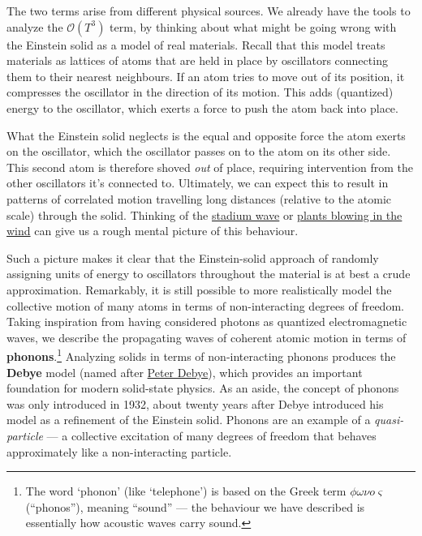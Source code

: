 \documentclass[12 pt]{article} %
\newcommand{\cO}{\ensuremath{\mathcal O} }
\newcommand{\om}{\ensuremath{\omega} }
\begin{document}
The two terms arise from different physical sources.
We already have the tools to analyze the $\cO(T^3)$ term, by thinking about what might be going wrong with the Einstein solid as a model of real materials.
Recall that this model treats materials as lattices of atoms that are held in place by oscillators connecting them to their nearest neighbours.
If an atom tries to move out of its position, it compresses the oscillator in the direction of its motion.
This adds (quantized) energy to the oscillator, which exerts a force to push the atom back into place.

What the Einstein solid neglects is the equal and opposite force the atom exerts on the oscillator, which the oscillator passes on to the atom on its other side.
This second atom is therefore shoved \textit{out} of place, requiring intervention from the other oscillators it's connected to.
Ultimately, we can expect this to result in patterns of correlated motion travelling long distances (relative to the atomic scale) through the solid.
Thinking of the \href{https://en.wikipedia.org/wiki/Wave_(audience)}{stadium wave} or \href{https://www.youtube.com/watch?v=uTlwzsud-zg}{plants blowing in the wind} can give us a rough mental picture of this behaviour.

Such a picture makes it clear that the Einstein-solid approach of randomly assigning units of energy to oscillators throughout the material is at best a crude approximation.
Remarkably, it is still possible to more realistically model the collective motion of many atoms in terms of non-interacting degrees of freedom.
Taking inspiration from having considered photons as quantized electromagnetic waves, we describe the propagating waves of coherent atomic motion in terms of \textbf{phonons}.\footnote{The word `phonon' (like `telephone') is based on the Greek term $\phi \om \nu o \varsigma$ (``phonos''), meaning ``sound'' --- the behaviour we have described is essentially how acoustic waves carry sound.}
Analyzing solids in terms of non-interacting phonons produces the \textbf{Debye} model (named after \href{https://en.wikipedia.org/wiki/Peter_Debye}{Peter Debye}), which provides an important foundation for modern solid-state physics.
As an aside, the concept of phonons was only introduced in 1932, about twenty years after Debye introduced his model as a refinement of the Einstein solid.
Phonons are an example of a \textit{quasi-particle} --- a collective excitation of many degrees of freedom that behaves approximately like a non-interacting particle.
\end{document}
